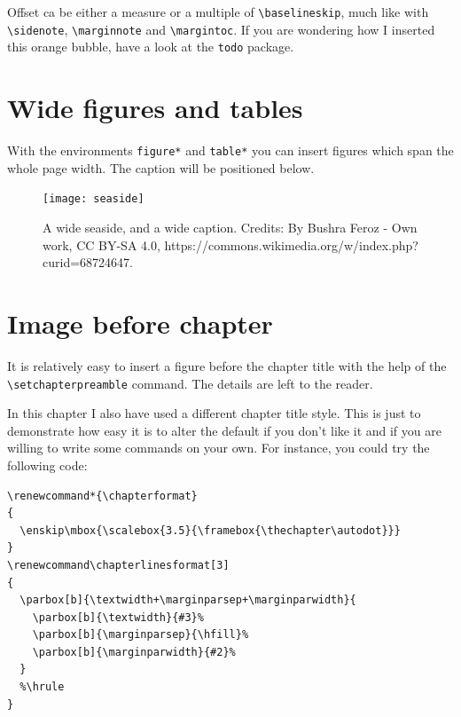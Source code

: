 Offset ca be either a measure or a multiple of \verb|\baselineskip|, 
much like with \verb|\sidenote|, \verb|\marginnote| and 
\verb|\margintoc|. If you are wondering how I 
inserted this orange bubble, have a look at the \verb|todo| package.

\section{Wide figures and tables}

With the environments \verb|figure*| and \verb|table*| you can insert 
figures which span the whole page width. The caption will be positioned 
below.

\begin{figure}
	\texttt{[image: seaside]}
	\vspace*{-1.3cm}
	\caption[A wide seaside]{A wide seaside, and a wide caption.
		Credits: By Bushra Feroz - Own work, CC BY-SA 4.0, 
		https://commons.wikimedia.org/w/index.php?curid=68724647.
		\blindtext}
\end{figure}

\section{Image before chapter}

It is relatively easy to insert a figure before the chapter title with 
the help of the \verb|\setchapterpreamble| command. The details are left 
to the reader.

In this chapter I also have used a different chapter title style. This 
is just to demonstrate how easy it is to alter the default if you don't 
like it and if you are willing to write some commands on your own. For 
instance, you could try the following code:

\begin{lstlisting}
\renewcommand*{\chapterformat}
{
  \enskip\mbox{\scalebox{3.5}{\framebox{\thechapter\autodot}}}
}
\renewcommand\chapterlinesformat[3]
{
  \parbox[b]{\textwidth+\marginparsep+\marginparwidth}{
	\parbox[b]{\textwidth}{#3}%
	\parbox[b]{\marginparsep}{\hfill}%
	\parbox[b]{\marginparwidth}{#2}%
  }
  %\hrule
}
\end{lstlisting}
